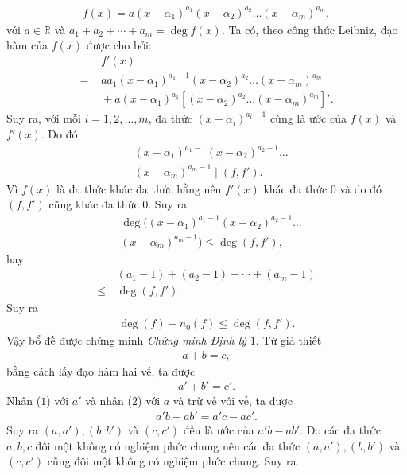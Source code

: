 \begin{multicols}{2}
\begin{align*}
		f(x) \!=\! a(x \!-\! \alpha_1)^{a_1}(x \!-\! \alpha_2)^{a_2}\ldots (x \!-\! \alpha_m)^{a_m},
	\end{align*}
	với $a\in \mathbb{R}$ và $a_1+a_2+\cdots+a_m=\deg f(x).$
	Ta có, theo công thức Leibniz, đạo hàm của $f(x)$ được cho bởi:
	\begin{align*}
		&f'(x) \\
		=\,\,& aa_1(x - \alpha_1)^{a_1-1}(x - \alpha_2)^{a_2} \ldots (x - \alpha_m)^{a_m}  \\
		&\!+  a(x - \alpha_1)^{a_1} [(x - \alpha_2)^{a_2}\ldots(x - \alpha_m)^{a_m}]'.
	\end{align*}
	Suy ra, với mỗi $i=1, 2, \ldots, m$, đa thức $(x-\alpha_i)^{a_i-1}$ cùng là ước của $f(x)$ và $f'(x)$.
	Do đó 
	\begin{align*}
		&(x - \alpha_1)^{a_1 - 1}(x - \alpha_2)^{a_2 - 1} \ldots \\
		&(x - \alpha_m)^{a_m - 1} \mid (f,f').
	\end{align*} 
	Vì $f(x)$ là đa thức khác đa thức hằng nên $f'(x)$ khác đa thức $0$ và do đó $(f, f')$ cũng khác đa thức $0$. Suy ra
	\begin{align*}
		&\deg((x - \alpha_1)^{a_1 - 1}(x - \alpha_2)^{a_2 - 1}\ldots \\
		&(x - \alpha_m)^{a_m - 1}) \leq \deg(f,f'),
	\end{align*} 
	hay 
	\begin{align*}
		&(a_1-1)+(a_2-1)+\cdots+(a_m-1)\\
		\leq \,&\deg (f,f').
	\end{align*}
	Suy ra
	\begin{align*}
		\deg(f) - n_0(f) \leq \deg(f,f').
	\end{align*}
	Vậy bổ đề được chứng minh
	\vskip 0.1cm
	\textit{Chứng minh Định lý} $1.$
	Từ giả thiết 
	\begin{align*}
		a + b = c, \tag{$1$} 
	\end{align*}
	bằng cách lấy đạo hàm hai vế, ta được
	\begin{align*}
		a' + b' = c'. \tag{$2$}
	\end{align*}
	Nhân ($1$) với $a'$ và nhân ($2$) với $a$ và trừ vế với vế, ta được
	\begin{align*}
		a'b - ab' = a'c - ac'.
	\end{align*}
	Suy ra $(a,a'), (b,b')$ và $(c,c')$ đều là ước của $a'b - ab'$.
	\vskip 0.1cm
	Do các đa thức $a,b,c$ đôi một không có nghiệm phức chung nên các đa thức $(a,a'), (b,b')$ và $(c,c')$ cũng đôi một không có nghiệm phức chung. Suy ra
	\begin{align*}

\end{align*}
\end{multicols}
